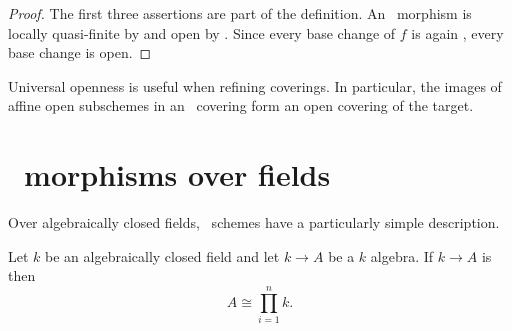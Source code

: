 \begin{proof}
	The first three assertions are part of the
	definition. An \etale\ morphism is locally
	quasi-finite by
	\cite[][Tag 03WS]{stacks-project} and open by
	\cite[][Tag 03WT]{stacks-project}.
	Since every base change of $f$ is again \etale,
	every base change is open.
\end{proof}

\begin{remark}
	Universal openness is useful when refining
	coverings. In particular, the images of affine
	open subschemes in an \etale\ covering form
	an open covering of the target.
\end{remark}


\section{\Etale\ morphisms over fields}

Over algebraically closed fields, \etale\ schemes have a particularly simple
description.

\begin{lemma}
	\label{lem:etale-algebra-structure-lemma}
	Let $k$ be an algebraically closed field and let $k \to A$ be a $k$ algebra. If $k\to A$ is \etale\, then
	\[
		A \cong \prod_{i=1}^n k.
	\]
\end{lemma}

